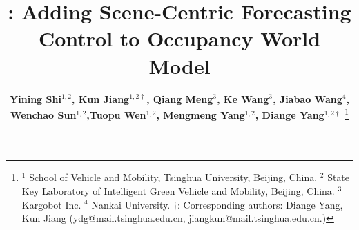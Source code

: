 \documentclass{article}
\title{\mtd{}: Adding Scene-Centric Forecasting \\ Control to Occupancy World Model}
\author{\textbf{Yining Shi$^{1,2}$, Kun Jiang$^{1,2\dagger}$, Qiang Meng$^{3}$, Ke Wang$^{3}$, Jiabao Wang$^{4}$, }\\ \textbf{Wenchao Sun$^{1,2}$,Tuopu Wen$^{1,2}$, Mengmeng Yang$^{1,2}$, Diange Yang$^{1,2\dagger}$ }
\thanks{$^{1}$ School of Vehicle and Mobility, Tsinghua University, Beijing, China. $^{2}$ State Key Laboratory of Intelligent Green Vehicle and Mobility, Beijing, China. $^{3}$ Kargobot Inc. $^{4}$ Nankai University. $\dagger$: Corresponding authors: Diange Yang, Kun Jiang (ydg@mail.tsinghua.edu.cn, jiangkun@mail.tsinghua.edu.cn.)}
}
\begin{document}
\maketitle














\newpage
\small{


}
\newpage



\end{document}
